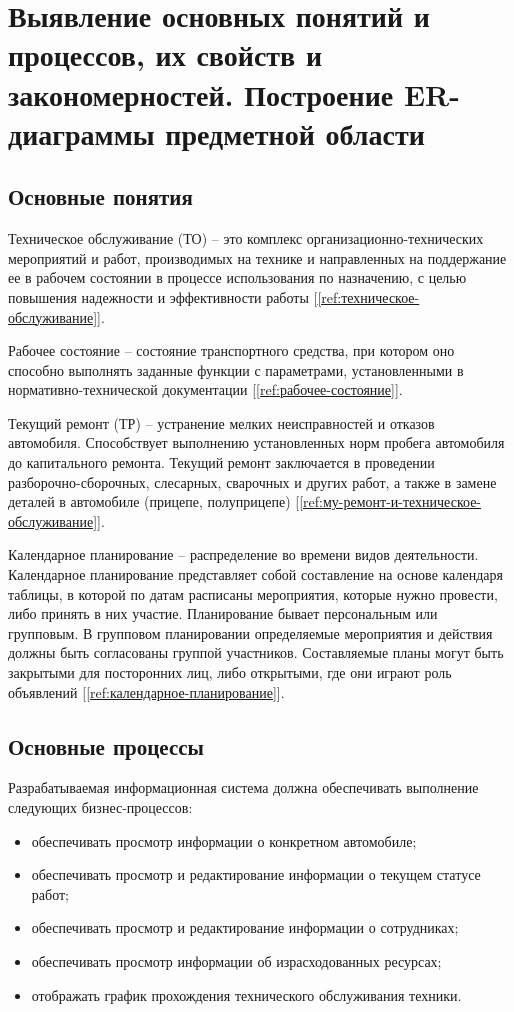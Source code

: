 \documentclass[../nirs.tex]{subfiles}
\begin{document}
\section{Выявление основных понятий и процессов, их свойств и закономерностей.
Построение ER-диаграммы предметной области}

\subsection{Основные понятия}
Техническое обслуживание (ТО) -- это комплекс организационно-технических
мероприятий и работ, производимых на технике и направленных на поддержание ее в
рабочем состоянии в процессе использования по назначению, с целью повышения
надежности и эффективности работы [\ref{ref:техническое-обслуживание}].

Рабочее состояние -- состояние транспортного средства, при котором оно способно
выполнять заданные функции с параметрами, установленными в
нормативно-технической документации [\ref{ref:рабочее-состояние}].

Текущий ремонт (ТР) -- устранение мелких неисправностей и отказов автомобиля.
Способствует выполнению установленных норм пробега автомобиля до капитального
ремонта. Текущий ремонт заключается в проведении разборочно-сборочных,
слесарных, сварочных и других работ, а также в замене деталей в автомобиле
(прицепе, полуприцепе) [\ref{ref:му-ремонт-и-техническое-обслуживание}].

Календарное планирование -- распределение во времени видов деятельности.
Календарное планирование представляет собой составление на основе календаря
таблицы, в которой по датам расписаны мероприятия, которые нужно провести, либо
принять в них участие. Планирование бывает персональным или групповым. В
групповом планировании определяемые мероприятия и действия должны быть
согласованы группой участников. Составляемые планы могут быть закрытыми для
посторонних лиц, либо открытыми, где они играют роль объявлений
[\ref{ref:календарное-планирование}].

\subsection{Основные процессы}
Разрабатываемая информационная система должна обеспечивать выполнение следующих
бизнес-процессов:
\begin{itemize}

  \item обеспечивать просмотр информации о конкретном автомобиле;

  \item обеспечивать просмотр и редактирование информации о текущем статусе
  работ;

  \item обеспечивать просмотр и редактирование информации о сотрудниках;

  \item обеспечивать просмотр информации об израсходованных ресурсах;

  \item отображать график прохождения технического обслуживания техники.

\end{itemize}
\end{document}
